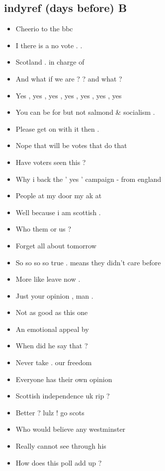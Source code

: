 \documentclass[tikz]{article}
\begin{document}
\begin{multicols}{2}
    \vfill
    \columnbreak

    \subsection*{indyref (days before) B}
    \begin{itemize}[noitemsep,nolistsep,label={}]
		\item{Cheerio to the bbc}
		\item{I there is a no vote . .}
		\item{Scotland . in charge of}
		\item{And what if we are ? ? and what ?}
		\item{Yes , yes , yes , yes , yes , yes , yes}
		\item{You can be for but not salmond \& socialism .}
		\item{Please get on with it then .}
		\item{Nope that will be votes that do that}
		\item{Have voters seen this ?}
		\item{Why i back the ' yes ' campaign - from england}
		\item{People at my door my ak at}
		\item{Well because i am scottish .}
		\item{Who them or us ?}
		\item{Forget all about tomorrow}
		\item{So so so so true . means they didn't care before}
		\item{More like leave now .}
		\item{Just your opinion , man .}
		\item{Not as good as this one}
		\item{An emotional appeal by}
		\item{When did he say that ?}
		\item{Never take . our freedom}
		\item{Everyone has their own opinion}
		\item{Scottish independence uk rip ?}
		\item{Better ? lulz ! go scots}
		\item{Who would believe any westminster}
		\item{Really cannot see through his}
		\item{How does this poll add up ?}

\end{itemize}
\end{multicols}
\end{document}
